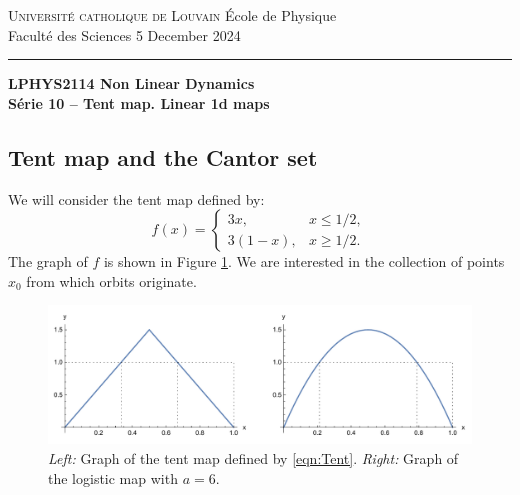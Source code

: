 \documentclass{article}
\begin{document}
\noindent
{\textsc{Universit\'e catholique de Louvain}} \hfill \'Ecole de Physique\\
Facult\'e des Sciences \hfill 5 December 2024\\
\hrule

\bigskip

\begin{center}
  \textbf{LPHYS2114 Non Linear Dynamics}\\
  \textbf{S\'erie 10 -- Tent map. Linear 1d maps}
\end{center}



\subsection*{Tent map and the Cantor set}

\noindent We will consider the tent map defined by:
  \begin{equation}
    f(x) =
    \begin{cases}
      3x, &  x \leqslant 1/2,\\
      3(1-x), & x \geqslant 1/2.
    \end{cases}
    \label{eqn:Tent}
  \end{equation}
   The graph of $f$ is shown in Figure \ref{fig:Tent}. We are interested in the collection of points $x_0$ from which orbits originate.
   
   
   \begin{figure}[h]
   \centering
   \includegraphics[width=\textwidth]{LogisticTent}
   \caption{\textit{Left:} Graph of the tent map defined by \eqref{eqn:Tent}. \textit{Right:} Graph of the logistic map with $a=6$.}
   \label{fig:Tent}
   \end{figure}
   
\end{document}

